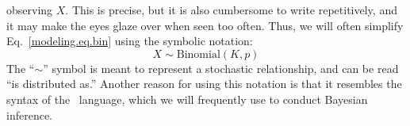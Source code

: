 observing $X$. This is precise, but it is also cumbersome to write repetitively,
and it may make the eyes glaze over when seen too often. Thus, we will
often simplify Eq.~\ref{modeling.eq.bin} using the symbolic notation:
\begin{equation}
  X \sim \text{Binomial}(K, p)
  \label{modeling.eq.binsym}
\end{equation}
The ``$\sim$'' symbol is meant to represent a stochastic relationship, and
can be read ``is distributed as.''
Another reason for using this notation is that
it resembles the syntax of the \bugs~language, which we will
frequently use to conduct Bayesian inference.

